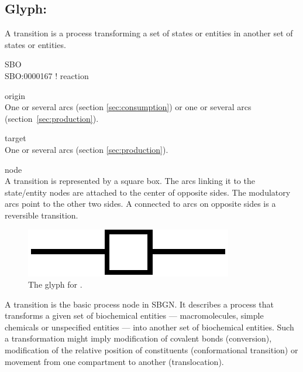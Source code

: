 \subsection{Glyph: }\label{sec:transition}

A transition is a process transforming a set of states or entities in another set of states or entities.

\begin{glyphDescription}
 \item[SBO]\mbox{}\\ SBO:0000167 ! reaction
 \item[origin]\mbox{}\\ One or several  arcs (section \ref{sec:consumption}) or one or several  arcs (section~\ref{sec:production}).
 \item[target]\mbox{}\\ One or several  arcs (section \ref{sec:production}).
 \item[node]\mbox{}\\ A transition is represented by a square box. The arcs linking it to the state/entity nodes are attached to the center of opposite sides. The modulatory arcs point to the other two sides. A  connected to  arcs on opposite sides is a reversible transition.
 \end{glyphDescription}

\begin{figure}[H]
  \centering
  \includegraphics[scale = 0.5]{images/transition}
  \caption{The \PD glyph for .}
  \label{fig:transition}
\end{figure}

A transition is the basic process node in SBGN. It describes a process that transforms a given set of biochemical entities --- macromolecules, simple 
chemicals or unspecified entities --- into another set of biochemical entities. Such a transformation might imply modification of covalent bonds (conversion), 
modification of the relative position of constituents (conformational transition) or movement from one compartment to another (translocation).


